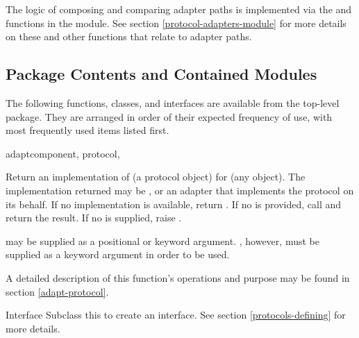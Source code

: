 \begin{verbatim%
}
\begin{verbatim%
}
\begin{verbatim%
}
\begin{verbatim%
}
\begin{verbatim%
}
\begin{verbatim%
}
\begin{seealso}

The logic of composing and comparing adapter paths is implemented via the
 and  functions in the
 module.  See section \ref{protocol-adapters-module}
for more details on these and other functions that relate to adapter paths.


\end{seealso}















\subsection{Package Contents and Contained Modules\label{protocols-contents}}

The following functions, classes, and interfaces are available from the
top-level  package.  They are arranged in order of
their expected frequency of use, with most frequently used items listed first.

\begin{funcdesc}{adapt}{component, protocol,
}

Return an implementation of  (a protocol object) for
 (any object).  The implementation returned may be
, or an adapter that implements the protocol on its
behalf.  If no implementation is available, return .  If no
 is provided, call  and return the result.  If no  is supplied,
raise .

 may be supplied as a positional or keyword argument.
, however, must be supplied as a keyword argument in order
to be used.

A detailed description of this function's operations and purpose may be found in
section \ref{adapt-protocol}.
\end{funcdesc}

\begin{classdesc*}{Interface}
Subclass this to create an interface.  See section \ref{protocols-defining}
for more details.
\end{classdesc*}













\end{verbatim%
}
\end{verbatim%
}
\end{verbatim%
}
\end{verbatim%
}
\end{verbatim%
}
\end{verbatim%
}
